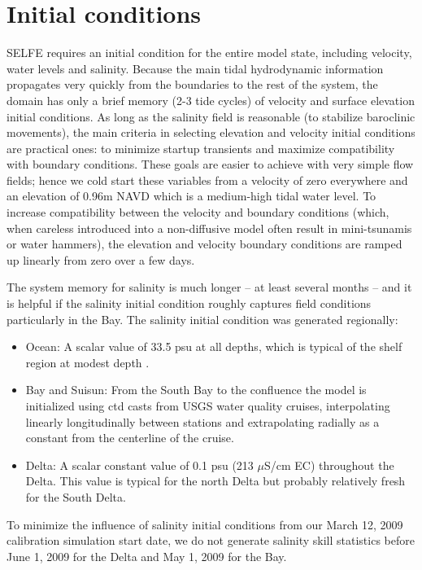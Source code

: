 \section{Initial conditions}
SELFE requires an initial condition for the entire model state, including velocity, water levels and salinity. Because the main
tidal hydrodynamic information propagates very quickly from the boundaries to the rest of the system, the domain has only a brief
memory (2-3 tide cycles) of velocity and surface elevation initial conditions. As long as the salinity field is reasonable (to
stabilize baroclinic movements), the main criteria in selecting elevation and velocity initial conditions are practical ones: to
minimize startup transients and maximize compatibility with boundary conditions. These goals are easier to achieve with very simple
flow fields; hence we cold start these variables from a velocity of zero everywhere and an elevation of 0.96m NAVD 
which is a medium-high tidal water level. To increase compatibility between the velocity and boundary conditions (which, when careless introduced into a non-diffusive model often result in mini-tsunamis or water hammers), the elevation and velocity
boundary conditions are ramped up linearly from zero over a few days. 

The system memory for salinity is much longer -- at least several months -- and it is helpful if the salinity initial condition roughly captures field conditions particularly in the Bay. The salinity initial condition was generated regionally:
\begin{itemize}
	\item Ocean: A scalar value of 33.5 psu at all depths,  which is typical of the shelf region at modest depth \citep{Dever94}.
	\item Bay and Suisun: From the South Bay to the confluence the model is initialized using \gls{ctd} casts from USGS water quality cruises, interpolating linearly longitudinally between stations and extrapolating radially as a constant from the centerline of the cruise.
	\item Delta: A scalar constant value of 0.1 psu (213 $\mu$S/cm EC) throughout the Delta. This value is typical for the north Delta but probably relatively fresh for the South Delta.
\end{itemize}

To minimize the influence of salinity initial conditions from our March 12, 2009 calibration simulation start date, we do not generate salinity skill statistics before June 1, 2009 for the Delta and May 1, 2009 for the Bay.

